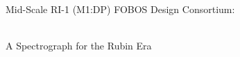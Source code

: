 \documentclass[oneside,11pt]{amsart}
\begin{document}


\vspace*{-1.5cm}


\centerline{\textsf {\Large Mid-Scale RI-1 (M1:DP) FOBOS Design Consortium:}}
\centerline{\textsf {\Large \\ A Spectrograph for the Rubin Era}}



\end{document}
